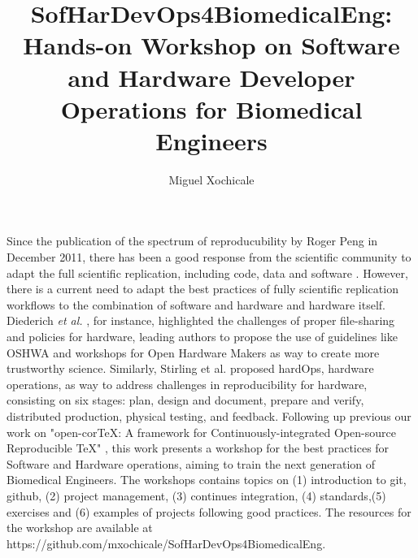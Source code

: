 \documentclass[11pt]{article}
\title{
SofHarDevOps4BiomedicalEng: Hands-on Workshop on Software and Hardware Developer Operations for Biomedical Engineers %
}
\author{Miguel Xochicale}
\date{\DTMNow}
\begin{document}
\maketitle

Since the publication of the spectrum of reproducubility by Roger Peng in December 2011, there has been a good response from the scientific community to adapt the full scientific replication, including code, data and software \cite{peng2011}. 
However, there is a current need to adapt the best practices of fully scientific replication workflows to the combination of software and hardware and hardware itself.
Diederich \textit{et al.} \cite{Diederich2022}, for instance, highlighted the challenges of proper file-sharing and policies for hardware, leading authors to propose the use of guidelines like OSHWA and workshops for Open Hardware Makers as way to create more trustworthy science. 
Similarly, Stirling et al. \cite{stirling2022} proposed hardOps, hardware operations, as way to address challenges in reproducibility for hardware, consisting on six stages: plan, design and document, prepare and verify, distributed production, physical testing, and feedback. 
Following up previous our work on "open-corTeX: A framework for Continuously-integrated Open-source Reproducible TeX"
\cite{xochicale2020}, this work presents a workshop for the best practices for Software and Hardware operations, aiming to train the next generation of Biomedical Engineers.
The workshops contains topics on (1) introduction to git, github, (2) project management, (3) continues integration, (4) standards,(5) exercises and (6) examples of projects following good practices.
The resources for the workshop are available at https://github.com/mxochicale/SofHarDevOps4BiomedicalEng.

\newpage
%



\end{document}
